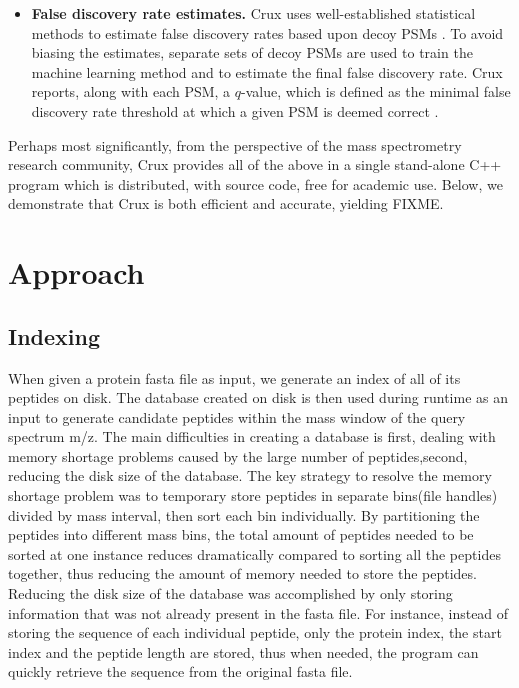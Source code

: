\documentclass{bioinfo}
\begin{document}
\begin{itemize}
\item {\bf False discovery rate estimates.}  Crux uses
  well-established statistical methods to estimate false discovery
  rates based upon decoy PSMs \cite{benjamini:controlling}.  To avoid
  biasing the estimates, separate sets of decoy PSMs are used to train
  the machine learning method and to estimate the final false
  discovery rate.  Crux reports, along with each PSM, a $q$-value,
  which is defined as the minimal false discovery rate threshold at
  which a given PSM is deemed correct \cite{storey:statistical}.

\end{itemize}

Perhaps most significantly, from the perspective of the mass
spectrometry research community, Crux provides all of the above in a
single stand-alone C++ program which is distributed, with source code,
free for academic use.  Below, we demonstrate that Crux is both
efficient and accurate, yielding FIXME.

\section{Approach}

\subsection{Indexing}
When given a protein fasta file as input, we generate an index of all
of its peptides on disk. The database created on disk is then used
during runtime as an input to generate candidate peptides within the
mass window of the query spectrum m/z. The main difficulties in
creating a database is first, dealing with memory shortage problems
caused by the large number of peptides,second, reducing the disk size
of the database. The key strategy to resolve the memory shortage
problem was to temporary store peptides in separate bins(file handles)
divided by mass interval, then sort each bin individually. By
partitioning the peptides into different mass bins, the total amount
of peptides needed to be sorted at one instance reduces dramatically
compared to sorting all the peptides together, thus reducing the
amount of memory needed to store the peptides. Reducing the disk size
of the database was accomplished by only storing information that was
not already present in the fasta file. For instance, instead of
storing the sequence of each individual peptide, only the protein
index, the start index and the peptide length are stored, thus when
needed, the program can quickly retrieve the sequence from the
original fasta file.
\end{document}
